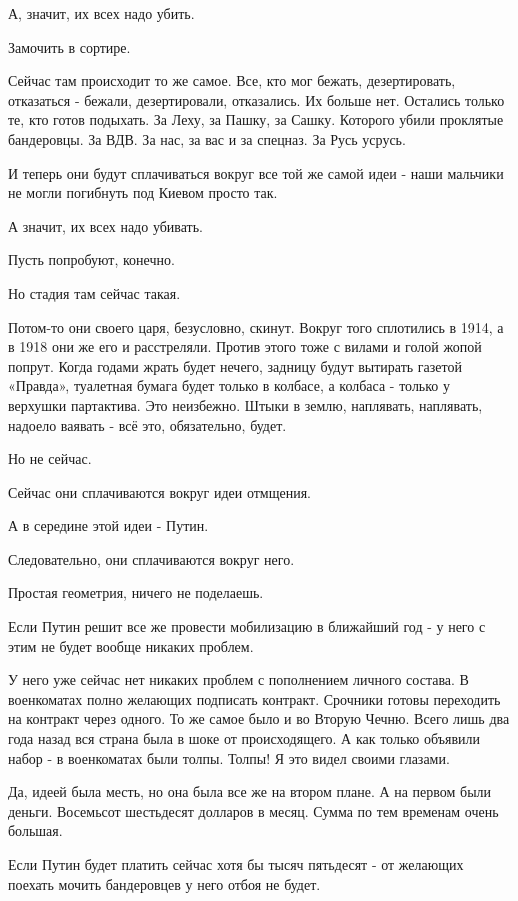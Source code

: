 А, значит, их всех надо убить. 

Замочить в сортире. 

Сейчас там происходит то же самое. Все, кто мог бежать, дезертировать,
отказаться - бежали, дезертировали, отказались. Их больше нет. Остались только
те, кто готов подыхать. За Леху, за Пашку, за Сашку. Которого убили проклятые
бандеровцы. За ВДВ. За нас, за вас и за спецназ. За Русь усрусь.

И теперь они будут сплачиваться вокруг все той же самой идеи - наши мальчики не
могли погибнуть под Киевом просто так. 

А значит, их всех надо убивать. 

Пусть попробуют, конечно. 

Но стадия там сейчас такая. 

Потом-то они своего царя, безусловно, скинут. Вокруг того сплотились в 1914, а
в 1918 они же его и расстреляли. Против этого тоже с вилами и голой жопой
попрут. Когда годами жрать будет нечего, задницу будут вытирать газетой
«Правда», туалетная бумага будет только в колбасе, а колбаса - только у
верхушки партактива. Это неизбежно. Штыки в землю, наплявать, наплявать,
надоело ваявать - всё это, обязательно, будет. 

Но не сейчас. 

Сейчас они сплачиваются вокруг идеи отмщения.

А в середине этой идеи - Путин. 

Следовательно, они сплачиваются вокруг него. 

Простая геометрия, ничего не поделаешь.

Если Путин решит все же провести мобилизацию в ближайший год - у него с этим не
будет вообще никаких проблем. 

У него уже сейчас нет никаких проблем с пополнением личного состава. В
военкоматах полно желающих подписать контракт. Срочники готовы переходить на
контракт через одного. То же самое было и во Вторую Чечню. Всего лишь два года
назад вся страна была в шоке от происходящего. А как только объявили набор - в
военкоматах были толпы. Толпы! Я это видел своими глазами. 

Да, идеей была месть, но она была все же на втором плане. А на первом были
деньги. Восемьсот шестьдесят долларов в месяц. Сумма по тем временам очень
большая. 

Если Путин будет платить сейчас хотя бы тысяч пятьдесят - от желающих поехать
мочить бандеровцев у него отбоя не будет. 

